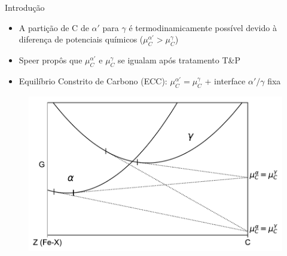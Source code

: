 \begin{frame}{Introdução}
  \begin{itemize}
    \item A partição de C de $\alpha'$ para $\gamma$ é termodinamicamente possível devido à diferença de potenciais químicos ($\mu_C^{\alpha'} > \mu_C^\gamma$)
    \item Speer propôs que $\mu_C^{\alpha'}$ e $\mu_C^\gamma$ se igualam após tratamento T\&P
    \item Equilíbrio Constrito de Carbono (ECC): $\mu_C^{\alpha'} = \mu_C^\gamma$  + interface $\alpha'/\gamma$ fixa
  \end{itemize}

  \begin{figure}
    \includegraphics[width=.7\textwidth]{img/common_tangent_CCE.pdf}
  \end{figure}
\end{frame}



